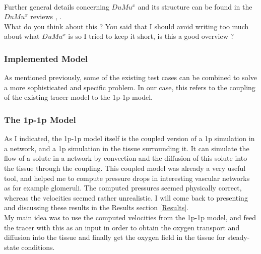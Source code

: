 \\Further general details concerning $DuMu^x$ and its structure can be found in the $DuMu^x$ reviews  \cite{flemischdumux}, \cite{flemisch2007dumux}.
\\ {\color{red} What do you think about this ? You said that I should avoid writing too much about what $DuMu^x$ is so I tried to keep it short, is this a good overview ?}

\subsubsection{Implemented Model}

As mentioned previously, some of the existing test cases can be combined to solve a more sophisticated and specific problem. In our case, this refers to the coupling of the existing tracer model to the 1p-1p model.\\

\subsubsection*{The 1p-1p Model}

As I indicated, the 1p-1p model itself is the coupled version of a 1p simulation in a network, and a 1p simulation in the tissue surrounding it. It can simulate the flow of a solute in a network by convection and the diffusion of this solute into the tissue through the coupling. This coupled model was already a very useful tool, and helped me to compute pressure drops in interesting vascular networks as for example glomeruli. The computed pressures seemed physically correct, whereas the velocities seemed rather unrealistic. I will come back to presenting and discussing these results in the Results section \ref{Results}.\\
My main idea was to use the computed velocities from the 1p-1p model, and feed the tracer with this as an input in order to obtain the oxygen transport and diffusion into the tissue and finally get the oxygen field in the tissue for steady-state conditions.\\


